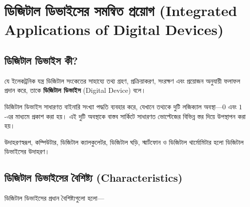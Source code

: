 
\section{ডিজিটাল ডিভাইসের সমন্বিত প্রয়োগ
(\textenglish{Integrated Applications of Digital Devices})}

\subsection{ডিজিটাল ডিভাইস কী?}

যে ইলেকট্রনিক যন্ত্র ডিজিটাল সংকেতের সাহায্যে তথ্য গ্রহণ, প্রক্রিয়াকরণ, সংরক্ষণ এবং প্রয়োজন অনুযায়ী ফলাফল প্রদান করে, তাকে \textbf{ডিজিটাল ডিভাইস} (\textenglish{Digital Device}) বলে।

ডিজিটাল ডিভাইস সাধারণত বাইনারি সংখ্যা পদ্ধতি ব্যবহার করে, যেখানে তথ্যকে দুটি লজিক্যাল অবস্থা—\(0\) এবং \(1\)-এর মাধ্যমে প্রকাশ করা হয়। এই দুটি অবস্থাকে বাস্তব সার্কিটে সাধারণত ভোল্টেজের বিভিন্ন স্তর দিয়ে উপস্থাপন করা হয়।

উদাহরণস্বরূপ, কম্পিউটার, ডিজিটাল ক্যালকুলেটর, ডিজিটাল ঘড়ি, স্মার্টফোন ও ডিজিটাল থার্মোমিটার হলো ডিজিটাল ডিভাইসের উদাহরণ।

\subsection{ডিজিটাল ডিভাইসের বৈশিষ্ট্য
(\textenglish{Characteristics})}

ডিজিটাল ডিভাইসের প্রধান বৈশিষ্ট্যগুলো হলো—


